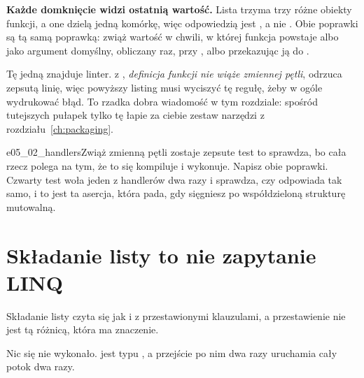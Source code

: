 

\begin{trapbox}
\textbf{Każde domknięcie widzi ostatnią wartość.} Lista trzyma trzy różne
obiekty funkcji, a one dzielą jedną komórkę, więc odpowiedzią jest
\code{[2, 2, 2]}, a nie \code{[0, 1, 2]}. Obie poprawki są tą samą poprawką:
zwiąż wartość w chwili, w której funkcja powstaje \dash{} albo jako argument
domyślny, obliczany raz, przy , albo przekazując ją do
.
\end{trapbox}


\noindent
Tę jedną znajduje linter.  z , \emph{definicja funkcji
nie wiąże zmiennej pętli}, odrzuca zepsutą linię, więc powyższy listing musi
wyciszyć tę regułę, żeby w ogóle wydrukować błąd. To rzadka dobra wiadomość
w tym rozdziale: spośród tutejszych pułapek tylko tę łapie za ciebie zestaw
narzędzi z rozdziału~\ref{ch:packaging}.

\begin{exercise}{e05_02_handlers}{Zwiąż zmienną pętli}
 zostaje zepsute \dash{} test to sprawdza, bo cała rzecz polega
na tym, że to się kompiluje i wykonuje. Napisz obie poprawki. Czwarty test
woła jeden z handlerów dwa razy i sprawdza, czy odpowiada tak samo, i to jest
ta asercja, która pada, gdy sięgniesz po współdzieloną strukturę mutowalną.
\end{exercise}

\section{Składanie listy to nie zapytanie LINQ}
\label{sec:ch05-comprehensions}

Składanie listy czyta się jak  i  z przestawionymi
klauzulami, a przestawienie nie jest tą różnicą, która ma znaczenie.

\begin{csbox}
Nic się nie wykonało.  jest typu , a
przejście po nim dwa razy uruchamia cały potok dwa razy.
\end{csbox}

